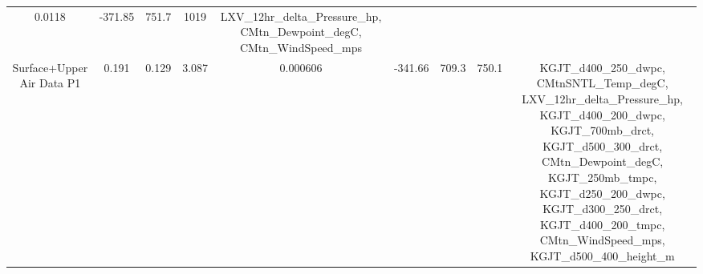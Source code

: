 \documentclass[11pt]{article}
\begin{document}
\begin{longtable}[]{@{}ccccccccc@{}}
\begin{minipage}[t]{0.08\columnwidth}
0.0118\strut
\end{minipage} & \begin{minipage}[t]{0.06\columnwidth}\centering\strut
-371.85\strut
\end{minipage} & \begin{minipage}[t]{0.03\columnwidth}\centering\strut
751.7\strut
\end{minipage} & \begin{minipage}[t]{0.03\columnwidth}\centering\strut
1019\strut
\end{minipage} & \begin{minipage}[t]{0.30\columnwidth}\centering\strut
LXV\_12hr\_delta\_Pressure\_hp, CMtn\_Dewpoint\_degC,
CMtn\_WindSpeed\_mps\strut
\end{minipage}\tabularnewline
\begin{minipage}[t]{0.10\columnwidth}\centering\strut
Surface+Upper Air Data P1\strut
\end{minipage} & \begin{minipage}[t]{0.04\columnwidth}\centering\strut
0.191\strut
\end{minipage} & \begin{minipage}[t]{0.06\columnwidth}\centering\strut
0.129\strut
\end{minipage} & \begin{minipage}[t]{0.06\columnwidth}\centering\strut
3.087\strut
\end{minipage} & \begin{minipage}[t]{0.08\columnwidth}\centering\strut
0.000606\strut
\end{minipage} & \begin{minipage}[t]{0.06\columnwidth}\centering\strut
-341.66\strut
\end{minipage} & \begin{minipage}[t]{0.03\columnwidth}\centering\strut
709.3\strut
\end{minipage} & \begin{minipage}[t]{0.03\columnwidth}\centering\strut
750.1\strut
\end{minipage} & \begin{minipage}[t]{0.30\columnwidth}\centering\strut
KGJT\_d400\_250\_dwpc, CMtnSNTL\_Temp\_degC,
LXV\_12hr\_delta\_Pressure\_hp, KGJT\_d400\_200\_dwpc,
KGJT\_700mb\_drct, KGJT\_d500\_300\_drct, CMtn\_Dewpoint\_degC,
KGJT\_250mb\_tmpc, KGJT\_d250\_200\_dwpc, KGJT\_d300\_250\_drct,
KGJT\_d400\_200\_tmpc, CMtn\_WindSpeed\_mps,
KGJT\_d500\_400\_height\_m\strut
\end{minipage}\tabularnewline
\bottomrule
\end{longtable}
\end{document}
